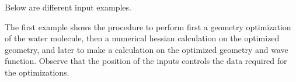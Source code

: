
Below are different input examples.


The first example shows the procedure to perform first a 
geometry optimization of the water molecule, then a numerical hessian
calculation on the optimized geometry, and later to make a 
calculation on the optimized geometry and wave function. Observe that
the position of the  inputs controls the data required
for the optimizations.


